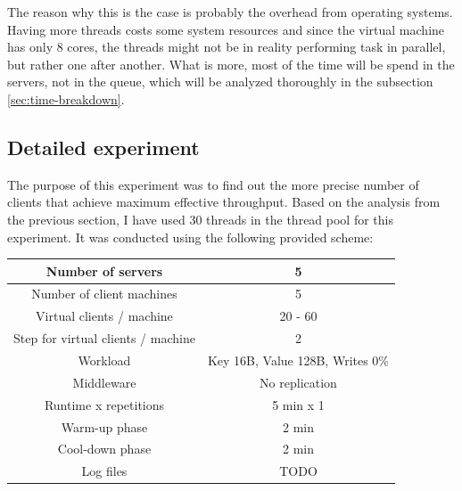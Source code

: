 \documentclass[11pt]{article}
\begin{document}
The reason why this is the case is probably 
the overhead from operating systems. Having more threads costs some system resources and since the virtual machine has only 8 cores, the threads might not be in reality performing task in parallel, but rather one after another. What is more, most of the time will be spend in the servers, not in the queue, which will be analyzed thoroughly in the subsection \ref{sec:time-breakdown}.

\subsection{Detailed experiment}

The purpose of this experiment was to find out the more precise number of clients that achieve maximum effective throughput. Based on the analysis from the previous section, I have used 30 threads in the thread pool for this experiment. It was conducted using the following provided scheme:
\medskip

\small{
\smallskip
\begin{tabular}{|c|c|}
\hline Number of servers & 5 \\ 
\hline Number of client machines & 5 \\ 
\hline Virtual clients / machine &  20 - 60 \\ 
\hline Step for virtual clients / machine & 2 \\
\hline Workload & Key 16B, Value 128B, Writes 0\% \\
\hline Middleware & No replication \\ 
\hline Runtime x repetitions & 5 min x 1 \\ 
\hline Warm-up phase & 2 min \\
\hline Cool-down phase & 2 min \\
\hline Log files & TODO \\
\hline 
\end{tabular} }
\medskip
\end{document}
